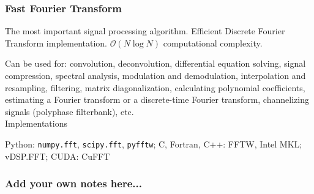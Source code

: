 \documentclass[6pt,landscape,a4paper]{article}
\begin{document}
\begin{multicols*}{5}
\subsubsection*{Fast Fourier Transform}
The most important signal processing algorithm. Efficient Discrete Fourier Transform implementation. $\mathcal{O}(N \log N)$ computational complexity.

Can be used for: convolution, deconvolution, differential equation solving, signal compression, spectral analysis, modulation and demodulation, interpolation and resampling, filtering, matrix diagonalization, calculating polynomial coefficients, estimating a Fourier transform or a discrete-time Fourier transform, channelizing signals (polyphase filterbank), etc.
\\
Implementations

Python: \verb|numpy.fft|, \verb|scipy.fft|, \verb|pyfftw|; C, Fortran, C++: FFTW, Intel MKL; vDSP.FFT; CUDA: CuFFT


\subsubsection*{Add your own notes here...}
\end{multicols*}
\end{document}
